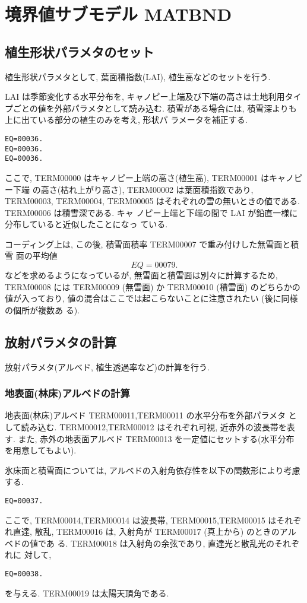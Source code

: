 \section{境界値サブモデル MATBND}

\subsection{植生形状パラメタのセット}

植生形状パラメタとして, 葉面積指数(LAI), 植生高などのセットを行う.

LAI は季節変化する水平分布を, キャノピー上端及び下端の高さは土地利用タイ
プごとの値を外部パラメタとして読み込む.
積雪がある場合には, 積雪深よりも上に出ている部分の植生のみを考え, 形状パ
ラメータを補正する.
\begin{verbatim}
EQ=00036.
EQ=00036.
EQ=00036.
\end{verbatim}
ここで, TERM00000 はキャノピー上端の高さ(植生高), TERM00001 はキャノピー下端
の高さ(枯れ上がり高さ), TERM00002 は葉面積指数であり, TERM00003, TERM00004,
TERM00005 はそれぞれの雪の無いときの値である. TERM00006 は積雪深である. キャ
ノピー上端と下端の間で LAI が鉛直一様に分布していると近似したことになっ
ている.

コーディング上は, この後, 積雪面積率 TERM00007 で重み付けした無雪面と積雪
面の平均値
\[
EQ=00079.
\]
などを求めるようになっているが, 無雪面と積雪面は別々に計算するため,
TERM00008 には TERM00009 (無雪面) か TERM00010 (積雪面) のどちらかの値が入っており,
値の混合はここでは起こらないことに注意されたい (後に同様の個所が複数あ
る).

\subsection{放射パラメタの計算}

放射パラメタ(アルベド, 植生透過率など)の計算を行う.

\subsubsection{地表面(林床)アルベドの計算}

地表面(林床)アルベド TERM00011,TERM00011 の水平分布を外部パラメタ
として読み込む. TERM00012,TERM00012 はそれぞれ可視, 近赤外の波長帯を表す.
また, 赤外の地表面アルベド TERM00013 を一定値にセットする(水平分布
を用意してもよい).

氷床面と積雪面については, アルベドの入射角依存性を以下の関数形により考慮
する.
\begin{verbatim}
EQ=00037.
\end{verbatim}
ここで, TERM00014,TERM00014 は波長帯, TERM00015,TERM00015 はそれぞれ直達, 散乱,
TERM00016 は, 入射角が TERM00017 (真上から) のときのアルベドの値であ
る. TERM00018 は入射角の余弦であり, 直達光と散乱光のそれぞれに
対して,
\begin{verbatim}
EQ=00038.
\end{verbatim}
を与える. TERM00019 は太陽天頂角である.

